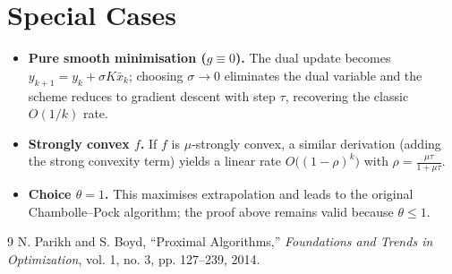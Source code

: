 \documentclass{article}
\begin{document}
\section*{Special Cases}
\begin{itemize}
\item \textbf{Pure smooth minimisation ($g\equiv0$).} The dual update becomes $y_{k+1}=y_{k}+\sigma K\bar x_{k}$; choosing $\sigma\to0$ eliminates the dual variable and the scheme reduces to gradient descent with step $\tau$, recovering the classic $O(1/k)$ rate.
\item \textbf{Strongly convex $f$.} If $f$ is $\mu$‑strongly convex, a similar derivation (adding the strong convexity term) yields a linear rate $O\bigl((1-\rho)^{k}\bigr)$ with $\rho=\frac{\mu\tau}{1+\mu\tau}$.
\item \textbf{Choice $\theta=1$.} This maximises extrapolation and leads to the original Chambolle–Pock algorithm; the proof above remains valid because $\theta\le1$.
\end{itemize}

\begin{thebibliography}{9}
N. Parikh and S. Boyd, ``Proximal Algorithms,'' \emph{Foundations and Trends in Optimization}, vol. 1, no. 3, pp. 127–239, 2014.
\end{thebibliography}
\end{document}
